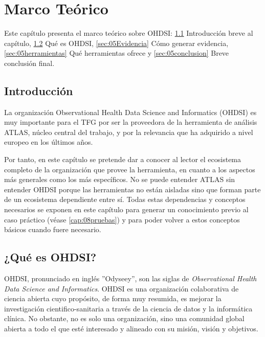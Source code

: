 \chapter{Marco Teórico}\label{cap:05EstudioPrevio}

Este capítulo presenta el marco teórico sobre OHDSI:  \ref{sec:05intro} Introducción breve al capítulo,  \ref{sec:05OHDSI} Qué es OHDSI,  \ref{sec:05Evidencia} Cómo generar evidencia, \ref{sec:05herramientas} Qué herramientas ofrece y \ref{sec:05conclusion} Breve conclusión final.

\section{Introducción} \label{sec:05intro}

La organización Observational Health Data Science and Informatics (OHDSI) es muy importante para el TFG por ser la proveedora de la herramienta de análisis ATLAS, núcleo central del trabajo, y por la relevancia que ha adquirido a nivel europeo en los últimos años.

Por tanto, en este capítulo se pretende dar a conocer al lector el ecosistema completo de la organización que provee la herramienta, en cuanto a los aspectos más generales como los más específicos. No se puede entender ATLAS sin entender OHDSI porque las herramientas no están aisladas sino que forman parte de un ecosistema dependiente entre sí. Todas estas dependencias y conceptos necesarios se exponen en este capítulo para generar un conocimiento previo al caso práctico (véase \ref{cap:08pruebas}) y para poder volver a estos conceptos básicos cuando fuere necesario.

\section{¿Qué es OHDSI?} \label{sec:05OHDSI}

OHDSI, pronunciado en inglés ''Odyseey'', son las siglas de \textit{Observational Health Data Science and Informatics}. OHDSI es una organización colaborativa de ciencia abierta cuyo propósito, de forma muy resumida, es mejorar la investigación cientifico-sanitaria a través de la ciencia de datos y la informática clínica. No obstante, no es solo una organización, sino una comunidad global abierta a todo el que esté interesado y alineado con su misión, visión y objetivos. 

